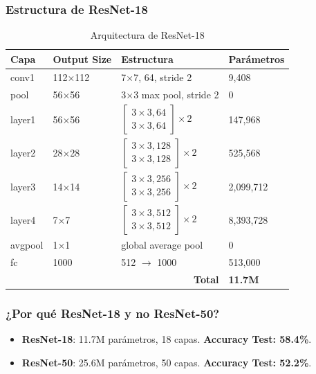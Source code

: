\documentclass[12pt,a4paper]{article}
\begin{document}
\subsubsection{Estructura de ResNet-18}

\begin{table}[H]
\centering
\caption{Arquitectura de ResNet-18}
\begin{tabular}{@{}llll@{}}
\toprule
\textbf{Capa} & \textbf{Output Size} & \textbf{Estructura} & \textbf{Parámetros} \\
\midrule
conv1 & 112×112 & 7×7, 64, stride 2 & 9,408 \\
pool & 56×56 & 3×3 max pool, stride 2 & 0 \\
layer1 & 56×56 & $\begin{bmatrix} 3\times3, 64 \\ 3\times3, 64 \end{bmatrix} \times 2$ & 147,968 \\
layer2 & 28×28 & $\begin{bmatrix} 3\times3, 128 \\ 3\times3, 128 \end{bmatrix} \times 2$ & 525,568 \\
layer3 & 14×14 & $\begin{bmatrix} 3\times3, 256 \\ 3\times3, 256 \end{bmatrix} \times 2$ & 2,099,712 \\
layer4 & 7×7 & $\begin{bmatrix} 3\times3, 512 \\ 3\times3, 512 \end{bmatrix} \times 2$ & 8,393,728 \\
avgpool & 1×1 & global average pool & 0 \\
fc & 1000 & 512 $\rightarrow$ 1000 & 513,000 \\
\midrule
\multicolumn{3}{r}{\textbf{Total}} & \textbf{11.7M} \\
\bottomrule
\end{tabular}
\end{table}

\subsubsection{¿Por qué ResNet-18 y no ResNet-50?}

\begin{itemize}
    \item \textbf{ResNet-18}: 11.7M parámetros, 18 capas. \textbf{Accuracy Test: 58.4\%}.
    \item \textbf{ResNet-50}: 25.6M parámetros, 50 capas. \textbf{Accuracy Test: 52.2\%}.
\end{itemize}
\end{document}
